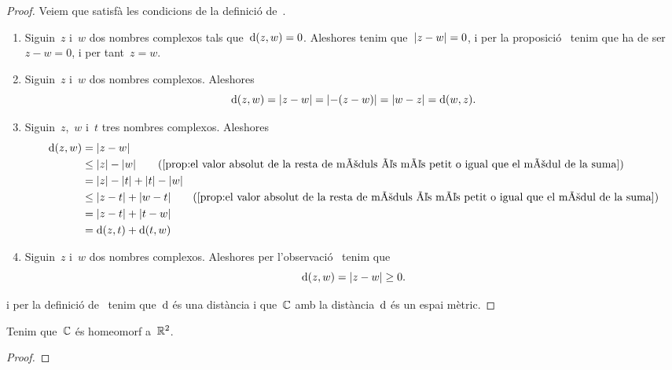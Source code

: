 \documentclass[../Apunts.tex]{subfiles}
\begin{document}
	\begin{proof}
		Veiem que satisfà les condicions de la definició de~.
		\begin{enumerate}
			\item Siguin~\(z\) i~\(w\) dos nombres complexos tals
				que~\(\operatorname{d}(z,w)=0\).
				Aleshores tenim que~\(\modul{z-w}=0\), i per la
				proposició~ tenim que ha de ser~\(z-w=0\),
				i per tant~\(z=w\).
			\item Siguin~\(z\) i~\(w\) dos nombres complexos.
				Aleshores
				\[
					\distancia(z,w)
					=\modul{z-w}
					=\modul{-(z-w)}
					=\modul{w-z}
					=\distancia(w,z).
				\]
			\item Siguin~\(z\),~\(w\) i~\(t\) tres nombres complexos.
				Aleshores
				\begin{align*}
					\distancia(z,w)&=\modul{z-w} \\
					&\leq\modul{z}-\modul{w}
					\tag{\ref{prop:el valor absolut de la resta de mòduls és %
					més petit o igual que el mòdul de la suma}}\\
					&=\modul{z}-\modul{t}+\modul{t}-\modul{w} \\
					&\leq\modul{z-t}+\modul{w-t}
					\tag{\ref{prop:el valor absolut de la resta de mòduls és %
					més petit o igual que el mòdul de la suma}}\\
					&=\modul{z-t}+\modul{t-w} \\
					&=\distancia(z,t)+\distancia(t,w)
				\end{align*}
			\item Siguin~\(z\) i~\(w\) dos nombres complexos.
				Aleshores per l'observació~ tenim que
			\[\distancia(z,w)=\modul{z-w}\geq0.\]
		\end{enumerate}
		i per la definició de~ tenim que~\(\operatorname{d}\)
		és una distància i que~\(\mathbb{C}\) amb la distància~\(\operatorname{d}\) és un
		espai mètric.
	\end{proof}
	\begin{proposition}
		\label{prop:el pla complex és homeomorf al pla real}
		Tenim que~\(\mathbb{C}\) és homeomorf a~\(\mathbb{R}^{2}\).
	\end{proposition}
	\begin{proof}
	\end{proof}
\end{document}
